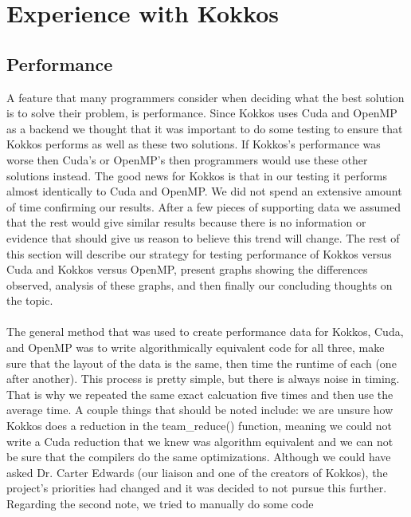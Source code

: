 \chapter{Experience with Kokkos}
\section{Performance}
A feature that many programmers consider when deciding what the best solution is
to solve their problem, is performance. Since Kokkos uses Cuda and OpenMP as a
backend we thought that it was important to do some testing to ensure that
Kokkos performs as well as these two solutions. If Kokkos's performance was
worse then Cuda's or OpenMP's then programmers would use these other solutions
instead. The good news for Kokkos is that in our testing it performs almost
identically to Cuda and OpenMP. We did not spend an extensive amount of time
confirming our results. After a few pieces of supporting data we assumed that
the rest would give similar results because there is no information or evidence
that should give us reason to believe this trend will change. The rest of this
section will describe our strategy for testing performance of Kokkos versus Cuda
and Kokkos versus OpenMP, present graphs showing the differences observed,
analysis of these graphs, and then finally our concluding thoughts on the topic.
\\
\\
The general method that was used to create performance data for Kokkos, Cuda,
and OpenMP was to write algorithmically equivalent code for all three, make sure
that the layout of the data is the same, then time the runtime of each (one
after another). This process is pretty simple, but there is always noise in
timing. That is why we repeated the same exact calcuation five times and 
then use the average time. A couple things that should be noted include: we are
unsure how Kokkos does a reduction in the team_reduce() function, meaning we
could not write a Cuda reduction that we knew was algorithm equivalent and we
can not be sure that the compilers do the same optimizations. Although
we could have asked Dr. Carter Edwards (our liaison and one of the creators of 
Kokkos), the project's priorities had changed and it was decided to not pursue
this further. Regarding the second note, we tried to manually do some code
